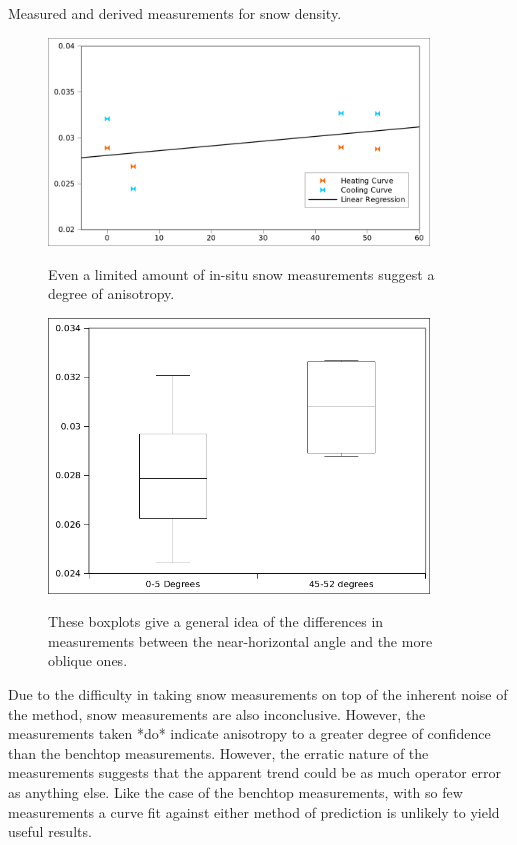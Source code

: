 \begin{table}[h]
\centering

\label{tab:density}
\caption{Measured and derived measurements for snow density.}
\end{table}

\begin{figure}[h]
\centering
\includegraphics[width=0.9\textwidth]{fig/snow_meas.png}
\label{fig:test_results}
\caption{Even a limited amount of in-situ snow measurements suggest a degree of
anisotropy.}
\end{figure}

\begin{figure}[h]
\centering
\includegraphics[width=0.9\textwidth]{fig/snow_meas_boxplot.png}
\label{fig:test_boxplot}
\caption{These boxplots give a general idea of the differences in measurements
between the near-horizontal angle and the more oblique ones.}
\end{figure}


Due to the difficulty in taking snow measurements on top of the inherent noise
of the method, snow measurements are also inconclusive. However, the
measurements taken *do* indicate anisotropy to a greater degree of confidence
than the benchtop measurements. However, the erratic nature of
the measurements suggests that the apparent trend could be as much operator
error as anything else. Like the case of the benchtop measurements, with so few
measurements a curve fit against either method of prediction is unlikely to
yield useful results.
